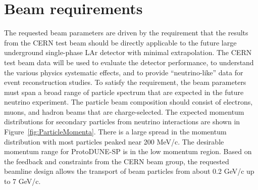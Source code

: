 \section{Beam requirements}
\label{sec:beamrequirements}

The requested beam parameters are driven by the requirement that the results from the CERN test beam should be directly applicable to the future large underground single-phase LAr detector with minimal extrapolation. The CERN test beam data will be used to evaluate the detector performance, to understand the various physics systematic effects, and to provide ``neutrino-like'' data for event reconstruction studies. To satisfy the requirement, the beam parameters must span a broad range of particle spectrum that are expected in the future neutrino experiment. The particle beam composition should consist of electrons, muons, and hadron beams that are charge-selected. The expected momentum distributions for secondary particles from neutrino interactions are shown in Figure~\ref{fig:ParticleMomenta}. There is a large spread in the momentum distribution with most particles peaked near 200 MeV/c.  The desirable momentum range for ProtoDUNE-SP  is in the low momentum region. Based on the feedback and constraints from the CERN beam group, the requested beamline design allows the transport of beam particles from about 0.2 GeV/c up to 7 GeV/c. 

